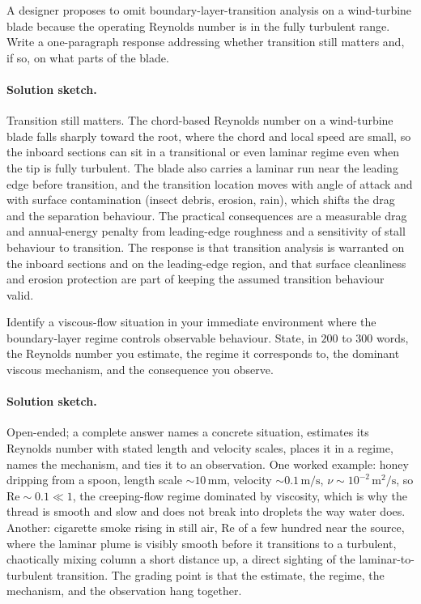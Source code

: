 \begin{exercise}
A designer proposes to omit boundary-layer-transition analysis on
a wind-turbine blade because the operating Reynolds number is in
the fully turbulent range. Write a one-paragraph response
addressing whether transition still matters and, if so, on what
parts of the blade.

\paragraph{Solution sketch.} Transition still matters. The chord-based
Reynolds number on a wind-turbine blade falls sharply toward the root,
where the chord and local speed are small, so the inboard sections can
sit in a transitional or even laminar regime even when the tip is
fully turbulent. The blade also carries a laminar run near the leading
edge before transition, and the transition location moves with angle
of attack and with surface contamination (insect debris, erosion,
rain), which shifts the drag and the separation behaviour. The
practical consequences are a measurable drag and annual-energy penalty
from leading-edge roughness and a sensitivity of stall behaviour to
transition. The response is that transition analysis is warranted on
the inboard sections and on the leading-edge region, and that surface
cleanliness and erosion protection are part of keeping the assumed
transition behaviour valid.
\end{exercise}

\begin{exercise}
Identify a viscous-flow situation in your immediate environment
where the boundary-layer regime controls observable behaviour.
State, in $200$ to $300$ words, the Reynolds number you estimate,
the regime it corresponds to, the dominant viscous mechanism, and
the consequence you observe.

\paragraph{Solution sketch.} Open-ended; a complete answer names a
concrete situation, estimates its Reynolds number with stated length
and velocity scales, places it in a regime, names the mechanism, and
ties it to an observation. One worked example: honey dripping from a
spoon, length scale $\sim10\,\si{\milli\meter}$, velocity $\sim
0.1\,\si{\meter\per\second}$, $\nu\sim10^{-2}\,\si{\meter}^2/\si{
\second}$, so $\text{Re}\sim0.1\ll1$, the creeping-flow regime
dominated by viscosity, which is why the thread is smooth and slow and
does not break into droplets the way water does. Another: cigarette
smoke rising in still air, $\text{Re}$ of a few hundred near the
source, where the laminar plume is visibly smooth before it transitions
to a turbulent, chaotically mixing column a short distance up, a
direct sighting of the laminar-to-turbulent transition. The grading
point is that the estimate, the regime, the mechanism, and the
observation hang together.
\end{exercise}
